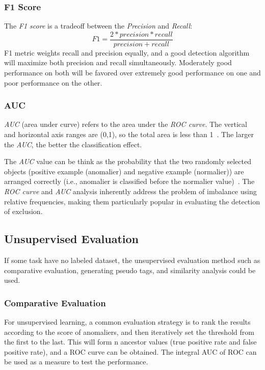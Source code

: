 \subsubsection{F1 Score}
The \textit{F1 score} is a tradeoff between
the \textit{Precision} and \textit{Recall}:
\begin{equation}
  F1=\frac{2*precision*recall}{precision+recall}
\end{equation}
F1 metric weights recall and
precision equally,
and a good detection algorithm will
maximize both precision and
recall simultaneously.
Moderately good performance on
both will be favored over
extremely good performance on
one and poor performance on the other.

\subsubsection{AUC}
\textit{AUC} (area under curve) refers to the area under the \textit{ROC curve}.
The vertical and horizontal axis ranges are (0,1),
so the total area is less than 1~\cite{bradley1997use}.
The larger the \textit{AUC},
the better the classification effect.

The \textit{AUC} value can be think as the probability that
the two randomly selected objects (positive example (anomalier)
and negative example (normalier)) are arranged correctly
(i.e.,
anomalier is classified before the normalier value)~\cite{hanley1982meaning}.
The \textit{ROC curve} and \textit{AUC}
analysis inherently address the problem of imbalance using
relative frequencies,
making them particularly popular in evaluating
the detection of exclusion.


\subsection{Unsupervised Evaluation}
If some task have no labeled dataset,
the unsupervised evaluation method
such as comparative evaluation,
generating pseudo tags,
and similarity analysis could be used.

\subsubsection{Comparative Evaluation}

For unsupervised learning,
a common evaluation strategy is to rank the
results according to the score of anomaliers,
and then iteratively set the threshold from
the first to the last.
This will form n ancestor values
(true positive rate and false positive rate),
and a ROC curve can be obtained.
The integral AUC of ROC can be used as a measure
to test the performance.


